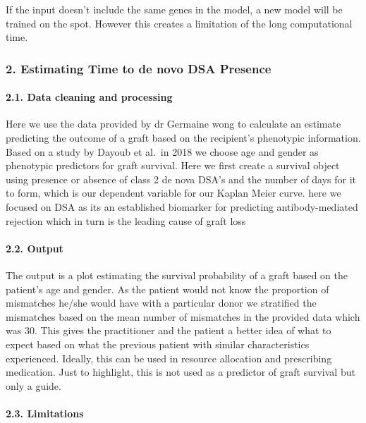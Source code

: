 \documentclass[a4paper,9pt,twocolumn,twoside,]{pinp}
\begin{document}
If the input doesn't include the same genes in the model, a new model
will be trained on the spot. However this creates a limitation of the
long computational time.

\hypertarget{estimating-time-to-de-novo-dsa-presence}{%
\subsubsection{2. Estimating Time to de novo DSA
Presence}\label{estimating-time-to-de-novo-dsa-presence}}

\hypertarget{data-cleaning-and-processing-1}{%
\paragraph{2.1. Data cleaning and
processing}\label{data-cleaning-and-processing-1}}

Here we use the data provided by dr Germaine wong to calculate an
estimate predicting the outcome of a graft based on the recipient's
phenotypic information. Based on a study by Dayoub et al.~in 2018 we
choose age and gender as phenotypic predictors for graft survival. Here
we first create a survival object using presence or absence of class 2
de nova DSA's and the number of days for it to form, which is our
dependent variable for our Kaplan Meier curve. here we focused on DSA as
its an established biomarker for predicting antibody-mediated rejection
which in turn is the leading cause of graft loss

\hypertarget{output-1}{%
\paragraph{2.2. Output}\label{output-1}}

The output is a plot estimating the survival probability of a graft
based on the patient's age and gender. As the patient would not know the
proportion of mismatches he/she would have with a particular donor we
stratified the mismatches based on the mean number of mismatches in the
provided data which was 30. This gives the practitioner and the patient
a better idea of what to expect based on what the previous patient with
similar characteristics experienced. Ideally, this can be used in
resource allocation and prescribing medication. Just to highlight, this
is not used as a predictor of graft survival but only a guide.

\hypertarget{limitations-1}{%
\paragraph{2.3. Limitations}\label{limitations-1}}
\end{document}
